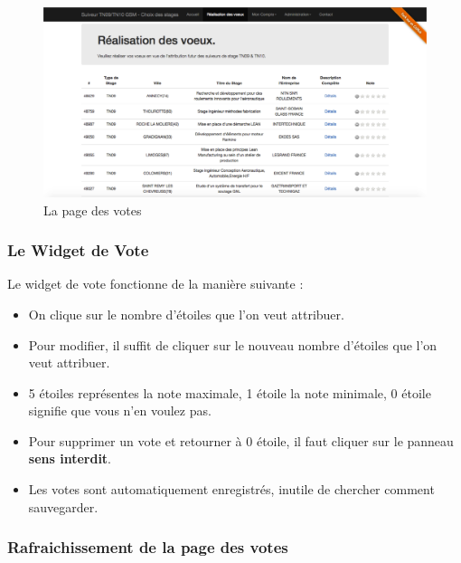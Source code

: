 \documentclass[a4paper,titlepage]{scrartcl}
\begin{document}
\begin{figure}[H]
	\vspace{-3mm}
	\begin{center}
		\includegraphics[scale=0.31]{Images/vote_1.png}
		\caption{La page des votes}
	\end{center}
\end{figure}



\subsubsection{Le Widget de Vote}

Le widget de vote fonctionne de la manière suivante :\\

\begin{itemize}
	\item On clique sur le nombre d'étoiles que l'on veut attribuer.
	
	\item Pour modifier, il suffit de cliquer sur le nouveau nombre d'étoiles que l'on veut attribuer.
	
	\item 5 étoiles représentes la note maximale, 1 étoile la note minimale, 0 étoile signifie que vous n'en voulez pas.
	
	\item Pour supprimer un vote et retourner à 0 étoile, il faut cliquer sur le panneau \textbf{sens interdit}.
	
	\item Les votes sont automatiquement enregistrés, inutile de chercher comment sauvegarder.
\end{itemize}


\subsubsection{Rafraichissement de la page des votes}
\end{document}
